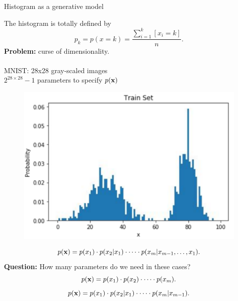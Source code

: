 \begin{frame}{Histogram as a generative model}

\begin{minipage}[t]{0.6\columnwidth}
    The histogram is totally defined by
	\[
	    p_k = p(x = k) = \frac{\sum_{i=1}^k [x_i = k]}{n}.
	\]
	\textbf{Problem:} curse of dimensionality. \\
	\vspace{0.05cm} \\
	MNIST: 28x28 gray-scaled images \\
	$2^{28\times28} - 1$ parameters to specify $p(\mathbf{x})$ 
	\end{minipage}%
	\begin{minipage}[t]{0.4\columnwidth}
    \begin{figure}[h]
        \centering
        \includegraphics[width=\linewidth]{figs/histogram.png}
    \end{figure}
\end{minipage}
\[
    p(\mathbf{x}) = p(x_1) \cdot p(x_2 | x_1) \cdot \dots \cdot p(x_m | x_{m-1}, \dots, x_1).
\]
\textbf{Question:} How many parameters do we need in these cases?
\[
    p(\mathbf{x}) = p(x_1) \cdot p(x_2)\cdot \dots \cdot p(x_m).
\]
\[
    p(\mathbf{x}) = p(x_1) \cdot p(x_2 | x_1) \cdot \dots \cdot p(x_m | x_{m-1}).
\]
\end{frame}
